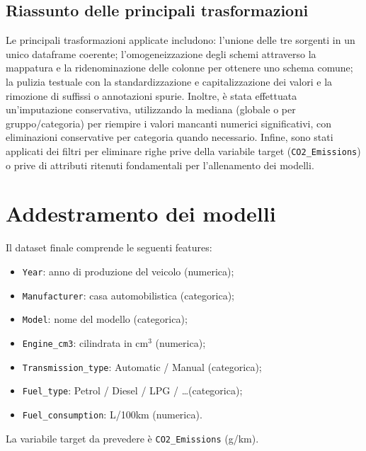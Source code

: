 \documentclass[a4paper,12pt]{report}
\begin{document}
	\subsection{Riassunto delle principali trasformazioni}
	Le principali trasformazioni applicate includono: l'unione delle tre sorgenti in un unico dataframe coerente; l'omogeneizzazione degli schemi attraverso la mappatura e la ridenominazione delle colonne per ottenere uno schema comune; la pulizia testuale con la standardizzazione e capitalizzazione dei valori e la rimozione di suffissi o annotazioni spurie. Inoltre, è stata effettuata un'imputazione conservativa, utilizzando la mediana (globale o per gruppo/categoria) per riempire i valori mancanti numerici significativi, con eliminazioni conservative per categoria quando necessario. Infine, sono stati applicati dei filtri per eliminare righe prive della variabile target (\texttt{CO2\_Emissions}) o prive di attributi ritenuti fondamentali per l'allenamento dei modelli.
	
	\section{Addestramento dei modelli}
	
	Il dataset finale comprende le seguenti features:
	\begin{itemize}
		\item \texttt{Year}: anno di produzione del veicolo (numerica);
		\item \texttt{Manufacturer}: casa automobilistica (categorica);
		\item \texttt{Model}: nome del modello (categorica);
		\item \texttt{Engine\_cm3}: cilindrata in \(\mathrm{cm^3}\) (numerica);
		\item \texttt{Transmission\_type}: Automatic / Manual (categorica);
		\item \texttt{Fuel\_type}: Petrol / Diesel / LPG / \ldots (categorica);
		\item \texttt{Fuel\_consumption}: L/100km (numerica).
	\end{itemize}
	La variabile target da prevedere è \texttt{CO2\_Emissions} (g/km).
	
\end{document}
